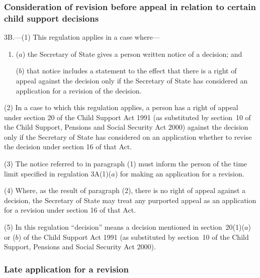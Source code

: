 \documentclass[12pt,a4paper]{article}
\begin{document}
\subsubsection[3B. Consideration of revision before appeal in relation to certain child support decisions]{Consideration of revision before appeal in relation to certain child support decisions}

3B.---(1)  This regulation applies in a case where—
\begin{enumerate}\item[]
($a$) the Secretary of State gives a person written notice of a decision; and

($b$) that notice includes a statement to the effect that there is a right of appeal against the decision only if the Secretary of State has considered an application for a revision of the decision.
\end{enumerate}

(2) In a case to which this regulation applies, a person has a right of appeal under section 20 of the Child Support Act 1991 (as substituted by section~10 of the Child Support, Pensions and Social Security Act 2000) against the decision only if the Secretary of State has considered on an application whether to revise the decision under section 16 of that Act.

(3) The notice referred to in paragraph (1) must inform the person of the time limit specified in regulation 3A(1)($a$)  for making an application for a revision.

(4) Where, as the result of paragraph (2), there is no right of appeal against a decision, the Secretary of State may treat any purported appeal as an application for a revision under section 16 of that Act.

(5) In this regulation “decision” means a decision mentioned in section~20(1)($a$)  or ($b$)  of the Child Support Act 1991 (as substituted by section~10 of the Child Support, Pensions and Social Security Act 2000).


\subsubsection[4. Late application for a revision]{Late application for a revision}
\end{document}
